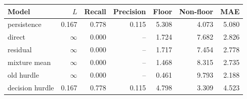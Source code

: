 \begin{tabular}{lrrrrrr}\hline
Model & $L$ & Recall & Precision & Floor & Non-floor & MAE\\\hline
persistence & 0.167 & 0.778 & 0.115 & 5.308 & 4.073 & 5.080\\
direct & $\infty$ & 0.000 & -- & 1.724 & 7.682 & 2.826\\
residual & $\infty$ & 0.000 & -- & 1.717 & 7.454 & 2.778\\
mixture mean & $\infty$ & 0.000 & -- & 1.468 & 8.315 & 2.735\\
old hurdle & $\infty$ & 0.000 & -- & 0.461 & 9.793 & 2.188\\
decision hurdle & 0.167 & 0.778 & 0.115 & 4.798 & 3.309 & 4.523\\
\hline\end{tabular}